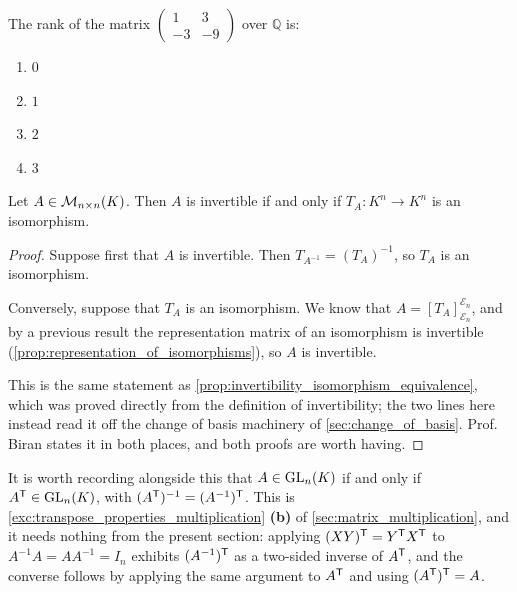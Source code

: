 \begin{exercise}
\label{exc:rank_2x2_matrix_sc}
The rank of the matrix $\left(\begin{smallmatrix} 1 & 3 \\ -3 & -9 \end{smallmatrix}\right)$ over $\mathbb{Q}$ is:
\begin{enumerate}
    \item $0$
    \item $1$
    \item $2$
    \item $3$
\end{enumerate}
\end{exercise}

\begin{lemma}
\label{lemma:invertible_iff_T_A_iso}
Let $A \in \mathcal{M}_{n \times n}(K)$. Then $A$ is invertible if and only if $T_A: K^n \to K^n$ is an isomorphism.
\end{lemma}

\begin{proof}
Suppose first that $A$ is invertible. Then $T_{A^{-1}} = (T_A)^{-1}$, so $T_A$ is an isomorphism.

Conversely, suppose that $T_A$ is an isomorphism. We know that $A = [T_A]_{\mathcal{E}_n}^{\mathcal{E}_n}$, and by a previous result the representation matrix of an isomorphism is invertible (\cref{prop:representation_of_isomorphisms}), so $A$ is invertible.

This is the same statement as \cref{prop:invertibility_isomorphism_equivalence}, which was proved directly from the definition of invertibility; the two lines here instead read it off the change of basis machinery of \cref{sec:change_of_basis}. Prof. Biran states it in both places, and both proofs are worth having.
\end{proof}

\begin{remark}
\label{rem:transpose_invertibility}
It is worth recording alongside this that $A \in \operatorname{GL}_n(K)$ if and only if $A^{\mathsf{T}} \in \operatorname{GL}_n(K)$, with $(A^{\mathsf{T}})^{-1} = (A^{-1})^{\mathsf{T}}$. This is \cref{exc:transpose_properties_multiplication} \textbf{(b)} of \cref{sec:matrix_multiplication}, and it needs nothing from the present section: applying $(XY)^{\mathsf{T}} = Y^{\mathsf{T}} X^{\mathsf{T}}$ to $A^{-1}A = A A^{-1} = I_n$ exhibits $(A^{-1})^{\mathsf{T}}$ as a two-sided inverse of $A^{\mathsf{T}}$, and the converse follows by applying the same argument to $A^{\mathsf{T}}$ and using $(A^{\mathsf{T}})^{\mathsf{T}} = A$.
\end{remark}

